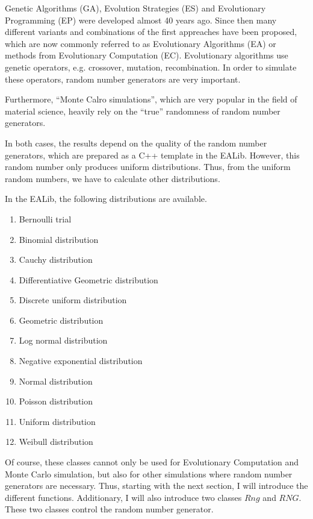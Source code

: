 \noindent
Genetic Algorithms (GA), Evolution Strategies (ES) and Evolutionary
Programming (EP) were developed almost 40 years ago. Since then many
different variants and combinations of the first appreaches have been
proposed, which are now commonly referred to as Evolutionary
Algorithms (EA) or methods from Evolutionary Computation
(EC). Evolutionary algorithms use genetic operators, e.g. crossover,
mutation, recombination. In order to simulate these operators, random
number generators are very important.

\vspace*{5mm}

\noindent
Furthermore, ``Monte Calro simulations'', which are very popular in
the field of material science, heavily rely on the ``true'' randomness
of random number generators.

\vspace*{5mm}

\noindent
In both cases, the results depend on the quality of the random number
generators, which are prepared as a C++ template in the EALib. However,
this random number only produces uniform distributions. Thus, from the
uniform random numbers, we have to calculate other distributions.

\vspace*{5mm}

\noindent
In the EALib, the following distributions are available.

\vspace*{10mm}

\begin{enumerate}
\item Bernoulli trial
\item Binomial distribution
\item Cauchy distribution
\item Differentiative Geometric distribution
\item Discrete uniform distribution
\item Geometric distribution
\item Log normal distribution
\item Negative exponential distribution
\item Normal distribution
\item Poisson distribution
\item Uniform distribution
\item Weibull distribution
\end{enumerate}

\vspace*{10mm}

\noindent
Of course, these classes cannot only be used for Evolutionary
Computation and Monte Carlo simulation, but also for other simulations
where random number generators are necessary. Thus, starting with the
next section, I will introduce the different functions. Additionary, I
will also introduce two classes $Rng$ and $RNG$. These two classes
control the random number generator.

